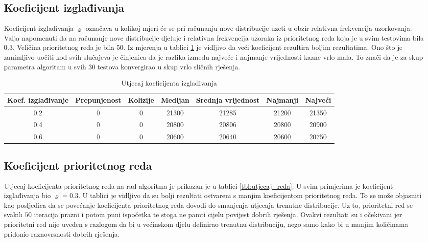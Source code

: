 \documentclass[times, utf8, zavrsni]{fer}
\begin{document}
\subsection{Koeficijent izglađivanja}
Koeficijent izglađivanja $\varrho$ označava u kolikoj mjeri će se pri računanju nove distribucije uzeti u obzir relativna frekvencija uzorkovanja. Valja napomenuti da na
računanje nove distribucije djeluje i relativna frekvencija uzoraka iz prioritetnog reda koja je u svim testovima bila $0.3$. Veličina prioritetnog reda je bila
$50$. Iz mjerenja u tablici \ref{tbl:utjecaj_izgladivanja} je vidljivo da veći koeficijent rezultira boljim rezultatima. Ono što je zanimljivo uočiti kod svih slučajeva
je činjenica da je razlika između najveće i najmanje vrijednosti kazne vrlo mala. To znači da je za skup parametra algoritam u svih 30 testova konvergirao u skup
vrlo sličnih rješenja.

\begin{table}
  \caption{Utjecaj koeficijenta izglađivanja}
  \label{tbl:utjecaj_izgladivanja}
  \centering
  \begin{tabular}{c | c | c | c | c | c | c  }
    Koef. izglađivanje &  Prepunjenost & Kolizije & Medijan & Srednja vrijednost & Najmanji & Najveći \\ \hline
    0.2 & 0 & 0 & 21300 & 21285 & 21200 & 21350  \\ \hline
    0.4 & 0 & 0 & 20800 & 20806 & 20800 & 20900  \\ \hline
    0.6 & 0 & 0 & 20600 & 20640 & 20600 & 20750
  \end{tabular}
\end{table}



\subsection{Koeficijent prioritetnog reda}
Utjecaj koeficijenta prioritetnog reda na rad algoritma je prikazan je u tablici \ref{tbl:utjecaj_reda}. U svim primjerima je koeficijent izglađivanja bio $\varrho = 0.3$.
U tablici je vidljivo da su bolji rezultati ostvareni s manjim koeficijentom prioritetnog reda. To se može objasniti kao posljedica da se povećanje koeficijenta prioritetnog
reda dovodi do smanjenja utjecaja trenutne distribucije. Uz to, prioritetni red se svakih $50$ iteracija prazni i potom puni ispočetka te stoga ne pamti cijelu povijest
dobrih rješenja. Ovakvi rezultati su i očekivani jer prioritetni red nije uveden s razlogom da bi u većinskom djelu definirao trenutnu distribuciju, nego samo kako bi
u manjim količinama pridonio raznovrsnosti dobrih rješenja.
\end{document}
